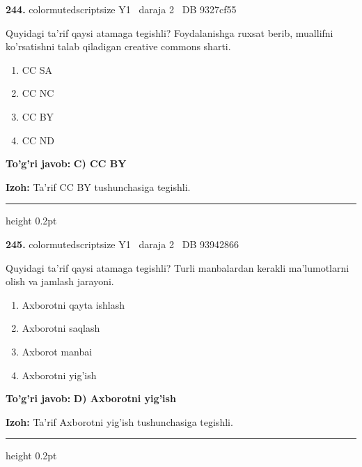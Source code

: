 \documentclass[10pt,a4paper,oneside]{article}
\begin{document}
\noindent\textbf{\color{ink}244.}  {color{muted}scriptsize Y1 \textbullet\ daraja 2 \textbullet\ DB 9327cf55}
\par
Quyidagi ta'rif qaysi atamaga tegishli? Foydalanishga ruxsat berib, muallifni ko'rsatishni talab qiladigan creative commons sharti.
\begin{enumerate}[label=\Alph*),leftmargin=9mm]
\item CC SA
\item CC NC
\item CC BY
\item CC ND
\end{enumerate}
\begin{tcolorbox}[enhanced,breakable,colback=teal!4,colframe=teal!50!black,boxrule=0.5pt,arc=1.1mm,left=3mm,right=3mm,top=1.7mm,bottom=1.7mm,before skip=2mm,after skip=2mm]
\textbf{\color{teal}To'g'ri javob:} \textbf{C) CC BY}
\par\smallskip
\textbf{Izoh:} Ta'rif CC BY tushunchasiga tegishli.
\end{tcolorbox}
\vspace{2mm}\hrule height 0.2pt \vspace{3mm}

\noindent\textbf{\color{ink}245.}  {color{muted}scriptsize Y1 \textbullet\ daraja 2 \textbullet\ DB 93942866}
\par
Quyidagi ta'rif qaysi atamaga tegishli? Turli manbalardan kerakli ma'lumotlarni olish va jamlash jarayoni.
\begin{enumerate}[label=\Alph*),leftmargin=9mm]
\item Axborotni qayta ishlash
\item Axborotni saqlash
\item Axborot manbai
\item Axborotni yig'ish
\end{enumerate}
\begin{tcolorbox}[enhanced,breakable,colback=teal!4,colframe=teal!50!black,boxrule=0.5pt,arc=1.1mm,left=3mm,right=3mm,top=1.7mm,bottom=1.7mm,before skip=2mm,after skip=2mm]
\textbf{\color{teal}To'g'ri javob:} \textbf{D) Axborotni yig'ish}
\par\smallskip
\textbf{Izoh:} Ta'rif Axborotni yig'ish tushunchasiga tegishli.
\end{tcolorbox}
\vspace{2mm}\hrule height 0.2pt \vspace{3mm}
\end{document}
